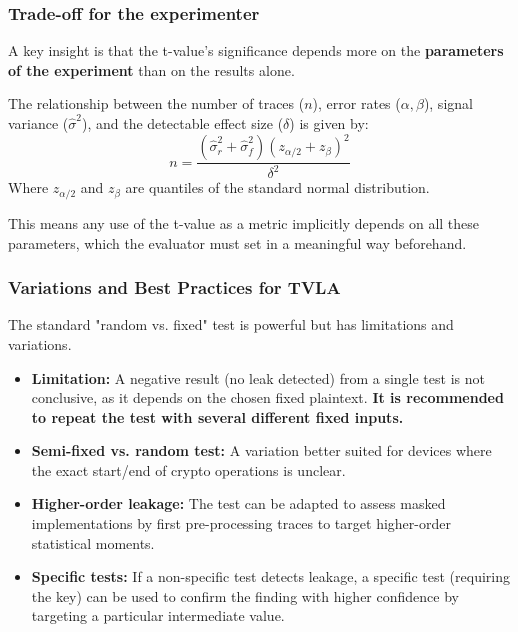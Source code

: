 \begin{frame}
    \frametitle{Trade-off for the experimenter }

    A key insight is that the t-value's significance depends more on the \textbf{parameters of the experiment} than on the results alone.
    
    \begin{block}{}
        The relationship between the number of traces ($n$), error rates ($\alpha, \beta$), signal variance ($\hat{\sigma}^2$), and the detectable effect size ($\delta$) is given by:
        \[ n = \frac{(\hat{\sigma}_r^2 + \hat{\sigma}_f^2)(z_{\alpha/2} + z_{\beta})^2}{\delta^2} \]
        Where $z_{\alpha/2}$ and $z_{\beta}$ are quantiles of the standard normal distribution.
    \end{block}
    
    This means any use of the t-value as a metric implicitly depends on all these parameters, which the evaluator must set in a meaningful way beforehand.
\end{frame}

\begin{frame}
    \frametitle{Variations and Best Practices for TVLA}
    
    The standard "random vs. fixed" test is powerful but has limitations and variations.
    
    \begin{itemize}
        \item \textbf{Limitation:} A negative result (no leak detected) from a single test is not conclusive, as it depends on the chosen fixed plaintext. \textbf{It is recommended to repeat the test with several different fixed inputs.}
        
        \item \textbf{Semi-fixed vs. random test:} A variation better suited for devices where the exact start/end of crypto operations is unclear.
        
        \item \textbf{Higher-order leakage:} The test can be adapted to assess masked implementations by first pre-processing traces to target higher-order statistical moments.
        
        \item \textbf{Specific tests:} If a non-specific test detects leakage, a specific test (requiring the key) can be used to confirm the finding with higher confidence by targeting a particular intermediate value.
    \end{itemize}
\end{frame}





